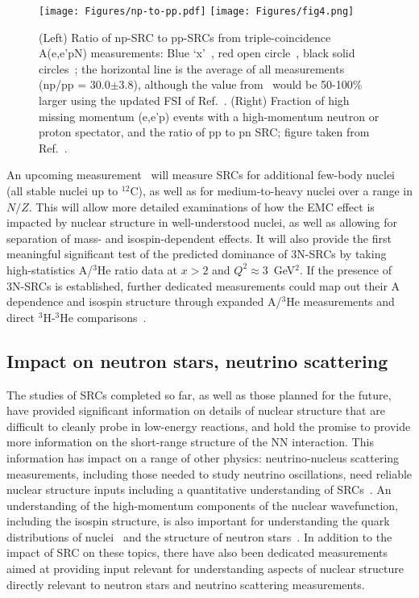 \begin{figure}[htb]
\centerline{
\texttt{[image: Figures/np-to-pp.pdf]}
\texttt{[image: Figures/fig4.png]}
}
\caption{(Left) Ratio of np-SRC to pp-SRCs from triple-coincidence A(e,e'pN) measurements: Blue `x'~\cite{Subedi:2008zz}, red open circle~\cite{LabHallA:2014wqo}, black solid circles~\cite{CLAS:2018xvc}; the horizontal line is the average of all measurements (np/pp = 30.0$\pm$3.8), although the value from~\cite{Subedi:2008zz} would be 50-100\% larger using the updated FSI of Ref.~\cite{CLAS:2018xvc}. (Right) Fraction of high missing momentum (e,e'p) events with a high-momentum neutron or proton spectator, and the ratio of pp to pn SRC; figure taken from Ref.~\cite{LabHallA:2014wqo}.}
\label{fig:SRC-isospin}
\end{figure}

An upcoming measurement~\cite{E12-06-105} will measure SRCs for additional few-body nuclei (all stable nuclei up to $^{12}$C), as well as for medium-to-heavy nuclei over a range in $N/Z$. This will allow more detailed examinations of how the EMC effect is impacted by nuclear structure in well-understood nuclei, as well as allowing for separation of mass- and isospin-dependent effects.  It will also provide the first meaningful significant test of the predicted dominance of 3N-SRCs by taking high-statistics A/$^3$He ratio data at $x>2$ and $Q^2 \approx 3$~GeV$^2$. If the presence of 3N-SRCs is established, further dedicated measurements could map out their A dependence and isospin structure through expanded A/$^3$He measurements and direct $^3$H-$^3$He comparisons~\cite{LOI12-21-001}. 



\subsection{Impact on neutron stars, neutrino scattering} \label{sec:PREX}

The studies of SRCs completed so far, as well as those planned for the future, have provided significant information on details of nuclear structure that are difficult to cleanly probe in low-energy reactions, and hold the promise to provide more information on the short-range structure of the NN interaction. This information has impact on a range of other physics: neutrino-nucleus scattering measurements, including those needed to study neutrino oscillations, need reliable nuclear structure inputs including a quantitative understanding of SRCs~\cite{Kulagin:2007ju, Niewczas:2015iea, VanCuyck:2016fab}. An understanding of the high-momentum components of the nuclear wavefunction, including the isospin structure, is also important for understanding the quark distributions of nuclei~\cite{Kulagin:2004ie} and the structure of neutron stars~\cite{Frankfurt:2008zv, Higinbotham:2009zz}. In addition to the impact of SRC on these topics, there have also been dedicated measurements aimed at providing input relevant for understanding aspects of nuclear structure directly relevant to neutron stars and neutrino scattering measurements.

